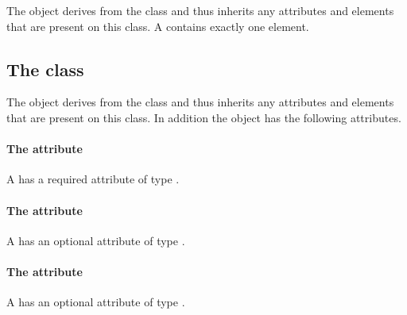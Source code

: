 
The \CSGTransformation object derives from the \CSGNode class and thus
inherits any attributes and elements that are present on this class.
A \CSGTransformation contains exactly one \CSGNode element.
\subsection{The  class}
\label{csgtranslation-class}




The \CSGTranslation object derives from the \CSGTransformation class and
thus inherits any attributes and elements that are present on this
class.
In addition the \CSGTranslation object has the following attributes.

\paragraph{The \fixttspace{} attribute}

A \CSGTranslation has a required attribute  of type
.


\paragraph{The \fixttspace{} attribute}

A \CSGTranslation has an optional attribute  of type
.


\paragraph{The \fixttspace{} attribute}

A \CSGTranslation has an optional attribute  of type
.


